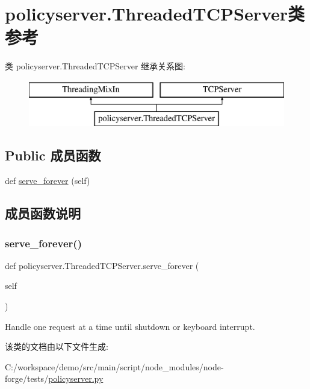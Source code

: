 \hypertarget{classpolicyserver_1_1_threaded_t_c_p_server}{}\section{policyserver.\+Threaded\+T\+C\+P\+Server类 参考}
\label{classpolicyserver_1_1_threaded_t_c_p_server}
类 policyserver.\+Threaded\+T\+C\+P\+Server 继承关系图\+:\begin{figure}[H]
\begin{center}
\leavevmode
\includegraphics[height=2.000000cm]{classpolicyserver_1_1_threaded_t_c_p_server}
\end{center}
\end{figure}
\subsection*{Public 成员函数}
\begin{DoxyCompactItemize}
\item 
def \mbox{\hyperlink{classpolicyserver_1_1_threaded_t_c_p_server_a521ce053f4dd3ce77dc5af4212925c29}{serve\+\_\+forever}} (self)
\end{DoxyCompactItemize}


\subsection{成员函数说明}
\mbox{\label{classpolicyserver_1_1_threaded_t_c_p_server_a521ce053f4dd3ce77dc5af4212925c29}} 
\subsubsection{\texorpdfstring{serve\+\_\+forever()}{serve\_forever()}}
{\footnotesize\ttfamily def policyserver.\+Threaded\+T\+C\+P\+Server.\+serve\+\_\+forever (\begin{DoxyParamCaption}\item[{}]{self }\end{DoxyParamCaption})}

\begin{DoxyVerb}Handle one request at a time until shutdown or keyboard interrupt.\end{DoxyVerb}
 

该类的文档由以下文件生成\+:\begin{DoxyCompactItemize}
\item 
C\+:/workspace/demo/src/main/script/node\+\_\+modules/node-\/forge/tests/\mbox{\hyperlink{policyserver_8py}{policyserver.\+py}}\end{DoxyCompactItemize}
